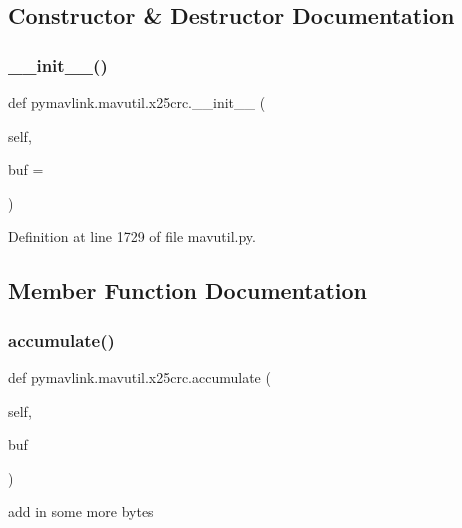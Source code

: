 \subsection{Constructor \& Destructor Documentation}
\mbox{\label{classpymavlink_1_1mavutil_1_1x25crc_a2ea5688ad6f11d1458495c83b5fb8369}} 
\subsubsection{\texorpdfstring{\_\_init\_\_()}{\_\_init\_\_()}}
{\footnotesize\ttfamily def pymavlink.\+mavutil.\+x25crc.\+\_\+\+\_\+init\+\_\+\+\_\+ (\begin{DoxyParamCaption}\item[{}]{self,  }\item[{}]{buf = {\ttfamily \textquotesingle{}\textquotesingle{}} }\end{DoxyParamCaption})}



Definition at line 1729 of file mavutil.\+py.



\subsection{Member Function Documentation}
\mbox{\label{classpymavlink_1_1mavutil_1_1x25crc_a0b923d79c74f524672adb0dc2ab0c337}} 
\subsubsection{\texorpdfstring{accumulate()}{accumulate()}}
{\footnotesize\ttfamily def pymavlink.\+mavutil.\+x25crc.\+accumulate (\begin{DoxyParamCaption}\item[{}]{self,  }\item[{}]{buf }\end{DoxyParamCaption})}

\begin{DoxyVerb}add in some more bytes\end{DoxyVerb}
 

